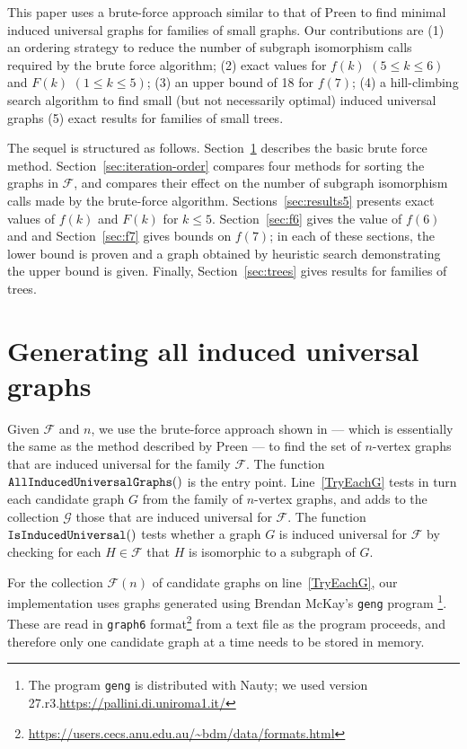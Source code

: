 \documentclass[12pt]{article}
\newcommand{\calF}{\ensuremath{\mathcal{F}}}
\newcommand{\calG}{\ensuremath{\mathcal{G}}}
\newcommand{\lineref}[1]{line~\ref{#1}}
\newcommand{\Lineref}[1]{Line~\ref{#1}}
\begin{document}
This paper uses a brute-force approach similar to that of Preen to find minimal
induced universal graphs for families of small graphs.  Our contributions
are (1) an ordering strategy to reduce the number of subgraph isomorphism
calls required by the brute force algorithm; (2) exact values for $f(k)$ $(5 \leq k \leq 6)$
and $F(k)$ $(1 \leq k \leq 5)$; (3) an upper bound of 18 for $f(7)$; (4) a hill-climbing
search algorithm to find small (but not necessarily optimal) induced universal graphs
(5) exact results for families of small trees.

The sequel is structured as follows.
Section~\ref{sec:method} describes the basic brute force method.
Section~\ref{sec:iteration-order} compares four methods for sorting
the graphs in $\calF$, and compares their effect on the number of subgraph
isomorphism calls made by the brute-force algorithm.
Sections~\ref{sec:results5} presents exact
values of $f(k)$ and $F(k)$ for $k \leq 5$.
Section~\ref{sec:f6} gives the value of $f(6)$ and and
Section~\ref{sec:f7} gives bounds on $f(7)$; in each of these sections, the lower
bound is proven and a graph obtained by heuristic search demonstrating the
upper bound is given.  Finally, Section~\ref{sec:trees} gives results for
families of trees.

\section{Generating all induced universal graphs}\label{sec:method}

Given $\calF$ and $n$,
we use the brute-force approach
shown in  --- which is essentially the same as the method
described by Preen \cite{preen_math_se} ---
to find the set of
$n$-vertex graphs that are induced universal for the family $\calF$.
The function $\FuncSty{AllInducedUniversalGraphs}()$ is the entry point.
\Lineref{TryEachG} tests in turn each candidate graph $G$ from the family
of $n$-vertex graphs, and adds to the collection $\calG$ those that are induced universal
for $\calF$.  The function $\FuncSty{IsInducedUniversal}()$ tests
whether a graph $G$ is induced universal for $\calF$ by checking for
each $H \in \calF$ that $H$ is isomorphic to a subgraph of $G$.

For the collection $\calF(n)$ of candidate graphs on \lineref{TryEachG}, our
implementation uses graphs generated using Brendan McKay's \texttt{geng}
program \cite{DBLP:journals/jal/McKay98}
\footnote{The program \texttt{geng} is distributed
with Nauty; we used version 27.r3.\url{https://pallini.di.uniroma1.it/}}.
These are read in \texttt{graph6}
format\footnote{\url{https://users.cecs.anu.edu.au/~bdm/data/formats.html}}
from a text file as the program proceeds, and therefore only one candidate
graph at a time needs to be stored in memory.
\end{document}
